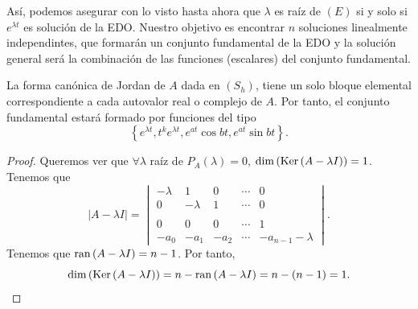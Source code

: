\begin{observation}
Así, podemos asegurar con lo visto hasta ahora que $\displaystyle \lambda  $ es raíz de $\displaystyle \left(E\right) $ si y solo si $\displaystyle e^{\lambda t} $ es solución de la EDO. Nuestro objetivo es encontrar $\displaystyle n $ soluciones linealmente independintes, que formarán un conjunto fundamental de la EDO y la solución general será la combinación de las funciones (escalares) del conjunto fundamental. 
\end{observation}
\begin{prop}
La forma canónica de Jordan de $\displaystyle A $ dada en $\displaystyle \left(S_{h}\right) $, tiene un solo bloque elemental correspondiente a cada autovalor real o complejo de $\displaystyle A $. Por tanto, el conjunto fundamental estará formado por funciones del tipo 
\[ \left\{ e^{\lambda t}, t ^{k}e^{\lambda t}, e^{at}\cos bt, e^{at}\sin bt\right\}  .\]
\end{prop}
\begin{proof}
Queremos ver que $\displaystyle \forall \lambda  $ raíz de $\displaystyle P_{A}\left(\lambda \right)=0 $, $\displaystyle \dim\left(\operatorname{Ker}\left(A-\lambda I\right)\right)=1 $. Tenemos que 
\[ \left|A-\lambda I\right|=\begin{vmatrix} -\lambda & 1 & 0 & \cdots & 0\\
0 & -\lambda & 1 & \cdots & 0 \\
  & & & & \\
0 & 0 & 0 & \cdots & 1 \\
-a_{0} & -a_{1} & -a_{2} & \cdots & -a_{n-1}-\lambda\end{vmatrix}  .\]
Tenemos que $\displaystyle \operatorname{ran}\left(A-\lambda I\right)=n-1 $. Por tanto, 
\[\dim\left(\operatorname{Ker}\left(A -\lambda I\right)\right)= n-\operatorname{ran}\left(A - \lambda I\right)=n - \left(n-1\right)=1 .\]
\end{proof}


